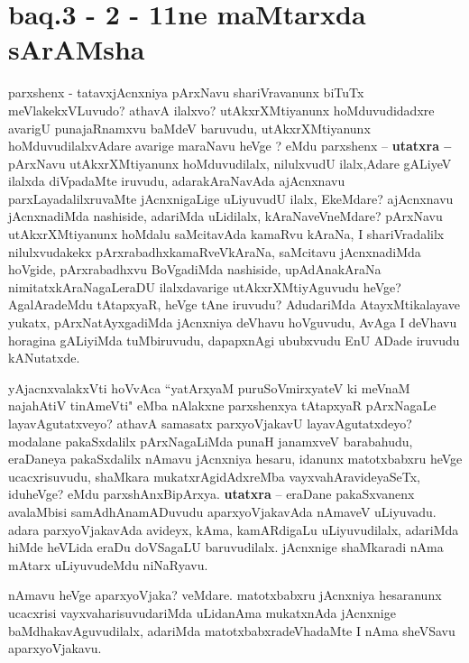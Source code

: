\section*{baq.3 - 2 - 11ne maMtarxda sArAMsha}

\begin{artha}
parxshenx - tatavxjAcnxniya pArxNavu shariVravanunx biTuTx meVlakekxVLuvudo? athavA ilalxvo? utAkxrXMtiyanunx hoMduvudidadxre avarigU punajaRnamxvu baMdeV baruvudu, utAkxrXMtiyanunx hoMduvudilalxvAdare avarige maraNavu heVge	? eMdu parxshenx --
\textbf{utatxra --} pArxNavu utAkxrXMtiyanunx hoMduvudilalx, nilulxvudU ilalx,Adare gALiyeV ilalxda diVpadaMte iruvudu, adarakAraNavAda ajAcnxnavu parxLayadalilxruvaMte jAcnxnigaLige uLiyuvudU ilalx, EkeMdare? ajAcnxnavu jAcnxnadiMda nashiside, adariMda uLidilalx, kAraNaveVneMdare? pArxNavu utAkxrXMtiyanunx hoMdalu saMcitavAda kamaRvu kAraNa, I shariVradalilx nilulxvudakekx pArxrabadhxkamaRveVkAraNa, saMcitavu jAcnxnadiMda hoVgide, pArxrabadhxvu BoVgadiMda nashiside, upAdAnakAraNa nimitatxkAraNagaLeraDU ilalxdavarige utAkxrXMtiyAguvudu heVge? AgalAradeMdu tAtapxyaR, heVge tAne iruvudu? AdudariMda AtayxMtikalayave yukatx, pArxNatAyxgadiMda jAcnxniya deVhavu hoVguvudu, AvAga I deVhavu horagina gALiyiMda tuMbiruvudu, dapapxnAgi ububxvudu EnU ADade iruvudu kANutatxde.
\end{artha}

\begin{artha}
yAjacnxvalakxVti hoVvAca ``yatArxyaM puruSoVmirxyateV ki meVnaM \break naja{\null}hAtiV tinAmeVti" eMba nAlakxne parxshenxya tAtapxyaR pArxNagaLe layavAgutatx\-veyo? athavA samasatx parxyoVjakavU layavAgutatxdeyo? modalane pakaSxdalilx pArxNa\-gaLiMda punaH janamxveV barabahudu, eraDaneya pakaSxdalilx nAmavu jAcnxniya hesaru, idanunx matotxbabxru heVge ucacxrisuvudu, shaMkara mukatxrAgidAdxreMba vayxvahAra\-videyaSeTx, iduheVge? eMdu parxshAnxBipArxya. \textbf{utatxra} -- eraDane pakaSxvanenx \-avalaMbisi samAdhAnamADuvudu aparxyoVjakavAda nAmaveV uLiyuvadu. adara parxyoVjakavAda avideyx, kAma, kamARdigaLu uLiyuvudilalx, adariMda hiMde heVLida eraDu doVSagaLU baruvudilalx. jAcnxnige shaMkaradi nAma mAtarx  uLiyuvudeMdu niNaRyavu.

nAmavu heVge aparxyoVjaka? veMdare. matotxbabxru jAcnxniya hesaranunx \-ucacxrisi vayxvaharisuvudariMda uLidanAma mukatxnAda jAcnxnige baMdhakavAgu\-vudilalx, adariMda matotxbabxradeVhadaMte I nAma sheVSavu aparxyoVjakavu.
\end{artha}

\centerline{}


